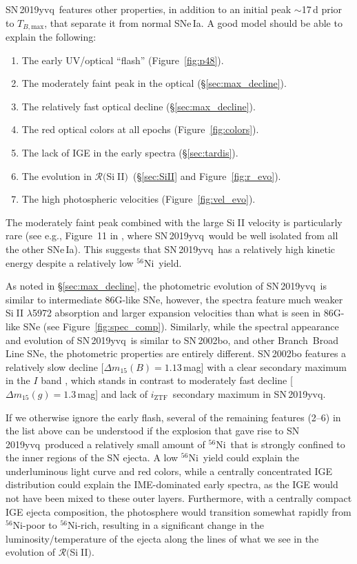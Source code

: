 \documentclass[twocolumn]{aastex63}
\def\ion#1#2{#1$\;${\footnotesize\rm{#2}}\relax}
\newcommand{\todo}[1]{{\color{magenta} to-do: {#1}}}
\newcommand{\iztf}{$i_\mathrm{ZTF}$}
\newcommand{\tbmax}{$T_{B,\mathrm{max}}$}
\newcommand{\RSiII}{$\mathcal{R}($\ion{Si}{II}$)$}
\newcommand{\radni}{$^{56}$Ni}
\newcommand{\sn}{SN\,2019yvq}
\begin{document}
\sn\ features other properties, in addition to an initial peak $\sim$17\,d
prior to \tbmax, that separate it from normal SNe\,Ia. A good model should be
able to explain the following:
%
\begin{enumerate}
    \item The early UV/optical ``flash'' (Figure~\ref{fig:p48}).
    \item The moderately faint peak in the optical (\S\ref{sec:max_decline}). 
    \item The relatively fast optical decline (\S\ref{sec:max_decline}). 
    \item The red optical colors at all epochs (Figure~\ref{fig:colors}). 
    \item The lack of IGE in the early spectra (\S\ref{sec:tardis}).
    \item The evolution in \RSiII\ (\S\ref{sec:SiII} and Figure~\ref{fig:r_evo}).
    \item The high photospheric velocities (Figure~\ref{fig:vel_evo}).
\end{enumerate}
%
The moderately faint peak combined with the large \ion{Si}{II} velocity is
particularly rare (see e.g., Figure~11 in \citealt{Polin19}, where \sn\ would
be well isolated from all the other SNe\,Ia). This suggests that \sn\ has a
relatively high kinetic energy despite a relatively low \radni\ yield.

As noted in \S\ref{sec:max_decline}, the photometric evolution of \sn\ is
similar to intermediate 86G-like SNe, however, the spectra feature much weaker
\ion{Si}{II} $\lambda$5972 absorption and larger expansion velocities than
what is seen in 86G-like SNe (see Figure~\ref{fig:spec_comp}). Similarly,
while the spectral appearance and evolution of \sn\ is similar to SN\,2002bo,
and other Branch~Broad Line SNe, the photometric properties are
entirely different. SN\,2002bo features a relatively slow decline
[$\Delta{m}_{15}(B) = 1.13$\,mag] with a clear secondary maximum in the $I$
band \citep{Benetti04}, which stands in contrast to moderately fast decline
[$\Delta{m}_{15}(g) = 1.3$\,mag] and lack of \iztf\ secondary maximum in \sn.

If we otherwise ignore the early flash, several of the remaining features
(2--6) in the list above can be understood if the explosion that gave rise to
\sn\ produced a relatively small amount of \radni\ that is strongly confined
to the inner regions of the SN ejecta. A low \radni\ yield could explain the
underluminous light curve and red colors, while a centrally concentrated IGE
distribution could explain the IME-dominated early spectra, as the IGE would
not have been mixed to these outer layers. Furthermore, with a centrally
compact IGE ejecta composition, the photosphere would transition somewhat
rapidly from \radni-poor to \radni-rich, resulting in a significant change in
the luminosity/temperature of the ejecta along the lines of what we see in the
evolution of \RSiII.
\end{document}
